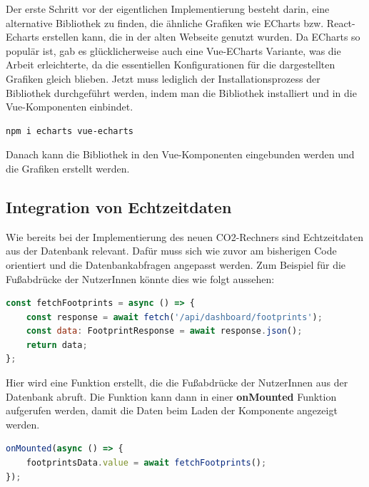 Der erste Schritt vor der eigentlichen Implementierung besteht darin, eine alternative Bibliothek zu finden, die ähnliche Grafiken wie ECharts bzw. React-Echarts erstellen kann, die in der alten Webseite genutzt wurden. Da ECharts so populär ist, gab es glücklicherweise auch eine Vue-ECharts Variante, was die Arbeit erleichterte, da die essentiellen Konfigurationen für die dargestellten Grafiken gleich blieben. Jetzt muss lediglich der Installationsprozess der Bibliothek durchgeführt werden, indem man die Bibliothek installiert und in die Vue-Komponenten einbindet.

\begin{lstlisting}[language={bash}, caption={Installation von Vue-ECharts}]
npm i echarts vue-echarts
\end{lstlisting}

Danach kann die Bibliothek in den Vue-Komponenten eingebunden werden und die Grafiken erstellt werden. \cite{vue-echarts}

\subsection{Integration von Echtzeitdaten}

Wie bereits bei der Implementierung des neuen CO2-Rechners sind Echtzeitdaten aus der Datenbank relevant. Dafür muss sich wie zuvor am bisherigen Code orientiert und die Datenbankabfragen angepasst werden. Zum Beispiel für die Fußabdrücke der NutzerInnen könnte dies wie folgt aussehen:

\begin{lstlisting}[language={JavaScript}, caption={Laden der Fußabdrücke der NutzerInnen}]
const fetchFootprints = async () => {
    const response = await fetch('/api/dashboard/footprints');
    const data: FootprintResponse = await response.json();
    return data;
};
\end{lstlisting}

Hier wird eine Funktion erstellt, die die Fußabdrücke der NutzerInnen aus der Datenbank abruft. Die Funktion kann dann in einer \textbf{onMounted} Funktion aufgerufen werden, damit die Daten beim Laden der Komponente angezeigt werden.

\begin{lstlisting}[language={JavaScript}, caption={Bei laden der Komponente die Fußabdrücke der NutzerInnen speichern}]
onMounted(async () => {
    footprintsData.value = await fetchFootprints();
});
\end{lstlisting}

